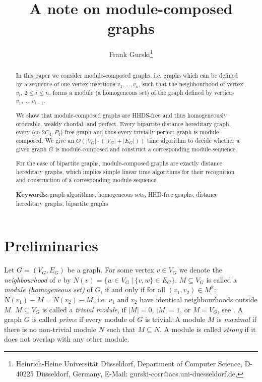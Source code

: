 \documentclass[11pt]{article}
\begin{document}
\title{A note on module-composed graphs}

\author{Frank Gurski\thanks{Heinrich-Heine Universit\"at D\"usseldorf,
Department of Computer Science, D-40225 D\"usseldorf, Germany,
E-Mail: gurski-corr@acs.uni-duesseldorf.de, }}



\bigskip

\maketitle

\begin{abstract}
In this paper we consider module-composed graphs, i.e. graphs which can be defined by a sequence of one-vertex insertions $v_1,\ldots,v_n$, such
that the neighbourhood of vertex $v_i$, $2\leq i\leq n$, forms a module (a homogeneous set) of the graph defined by vertices $v_1,\ldots,v_{i-1}$.

We show that
module-composed graphs are HHDS-free and thus homogeneously orderable, weakly chordal, and perfect. Every bipartite distance hereditary graph, every (co-$2C_4,P_4$)-free graph and thus every trivially perfect graph is module-composed. We give an $O(|V_G|\cdot (|V_G|+|E_G|))$ time algorithm to decide whether a given graph $G$ is module-composed and construct a corresponding 
module-sequence.

For the case of bipartite graphs, module-composed graphs
are exactly distance hereditary graphs, which implies
simple linear time algorithms for their recognition and construction of a corresponding module-sequence.

\bigskip
\noindent
{\bf Keywords:} graph algorithms, homogeneous sets, HHD-free graphs, distance hereditary graphs, bipartite graphs
\end{abstract}








\section{Preliminaries}




Let $G=(V_G,E_G)$ be a graph.
For some vertex $v\in V_G$ we denote the {\em neighbourhood} of $v$ by
$N(v)=\{w\in V_G~|~\{v,w\}\in E_G\}$. $M\subseteq V_G$ is called a {\em module (homogeneous set)} of $G$, if
and only if for all $(v_1,v_2)\in M^2$: $N(v_1)-M=N(v_2)-M$, i.e. $v_1$ and $v_2$ have
identical neighbourhoods outside $M$. $M\subseteq V_G$ is called a {\em trivial module},
if $|M|=0$,  $|M|=1$, or $M=V_G$, see \cite{CH94}. A graph $G$ is called {\em prime}
if every module of $G$ is trivial.
A module $M$ is {\em maximal} if there is no non-trivial module $N$ such that $M\subseteq N$.
A module is called {\em strong} if it does not overlap
with any other module. 
\end{document}
